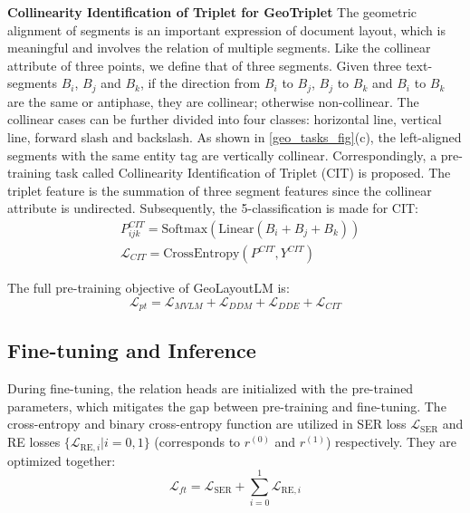 \documentclass[10pt,twocolumn,letterpaper]{article}
\begin{document}
\noindent\textbf{Collinearity Identification of Triplet for GeoTriplet} 
The geometric alignment of segments is an important expression of document layout, which is meaningful and involves the relation of multiple segments. 
Like the collinear attribute of three points, we define that of three segments. 
Given three text-segments $B_i$, $B_j$ and $B_k$, if the direction from $B_i$ to $B_j$, $B_j$ to $B_k$ and $B_i$ to $B_k$ are the same or antiphase, they are collinear; otherwise non-collinear. The collinear cases can be further divided into four classes: horizontal line, vertical line, forward slash and backslash.
As shown in \cref{geo_tasks_fig}(c), the left-aligned segments with the same entity tag are vertically collinear.
Correspondingly, a pre-training task called Collinearity Identification of Triplet (CIT) is proposed.
The triplet feature is the summation of three segment features since the collinear attribute is undirected. Subsequently, the 5-classification is made for CIT:
\vspace{-2mm}
\begin{align}
  &P^{CIT}_{ijk} = \mathrm{Softmax}(\mathrm{Linear}(B_i+B_j+B_k)) \\
  &\mathcal{L}_{CIT} = \mathrm{CrossEntropy}(P^{CIT}, Y^{CIT})
  \label{cit_loss}
\end{align}


The full pre-training objective of GeoLayoutLM is:
\begin{equation}
  \mathcal{L}_{pt} = \mathcal{L}_{MVLM} + \mathcal{L}_{DDM} + \mathcal{L}_{DDE} + \mathcal{L}_{CIT}
  \label{full_loss}
\end{equation}

\subsection{Fine-tuning and Inference}
During fine-tuning, the relation heads are initialized with the pre-trained parameters, which mitigates the gap between pre-training and fine-tuning.
The cross-entropy and binary cross-entropy function are utilized in SER loss $\mathcal{L}_{\mathrm{SER}}$ and RE losses $\{\mathcal{L}_{\mathrm{RE}, i}|i=0,1\}$ (corresponds to $r^{(0)}$ and $r^{(1)}$) respectively.
They are optimized together:
\vspace{-2mm}
\begin{equation}
  \mathcal{L}_{ft}=\mathcal{L}_{\mathrm{SER}}+\sum _{i=0}^1 \mathcal{L}_{\mathrm{RE},i}
  \label{loss_ft}
\end{equation}
\end{document}
